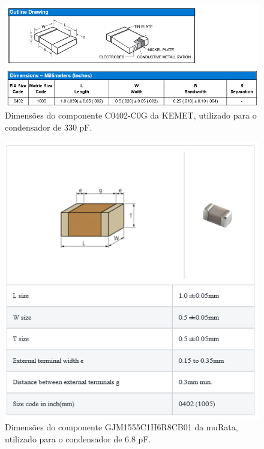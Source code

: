 \documentclass[11pt]{article}
\numberwithin{equation}{section}
\begin{document}
\begin{figure}[H]
\centering
\includegraphics[keepaspectratio=true, scale=0.45]{teoricas/330pF}
\vspace{-0.5em}
\caption{Dimensões do componente C0402-C0G da KEMET, utilizado para o condensador de 330 pF.}
\vspace{-0.8em}
\label{fig:C_330}
\end{figure}

\begin{figure}[H]
\centering
\includegraphics[keepaspectratio=true, scale=0.45]{teoricas/6_8pF}
\vspace{-0.5em}
\caption{Dimensões do componente GJM1555C1H6R8CB01 da muRata, utilizado para o condensador de 6.8 pF.}
\vspace{-0.8em}
\label{fig:C_6_8}
\end{figure}
\end{document}
